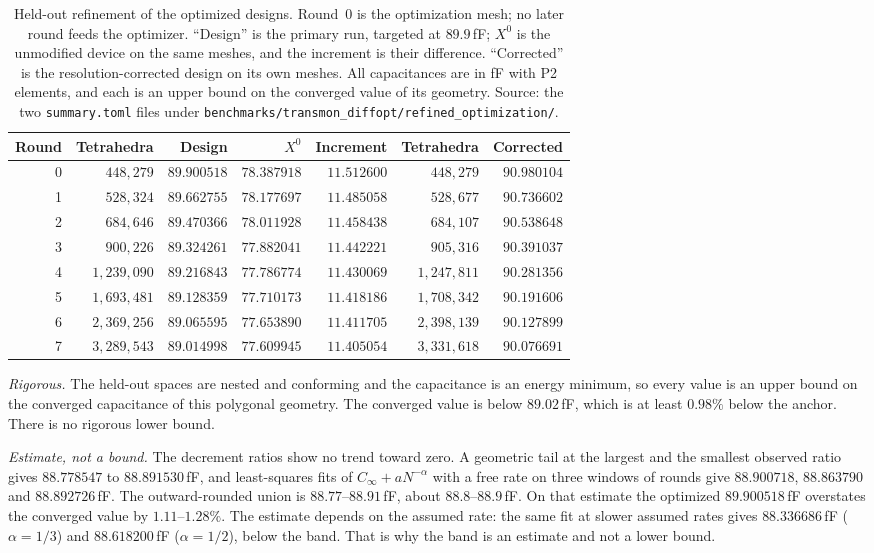 \documentclass{anvil-paper}
\begin{document}
\begin{table}[t]
  \centering
  \caption{Held-out refinement of the optimized designs. Round~0 is the
  optimization mesh; no later round feeds the optimizer. ``Design'' is
  the primary run, targeted at $89.9$\,fF; $X^0$ is the unmodified
  device on the same meshes, and the increment is their difference.
  ``Corrected'' is the resolution-corrected design on its own meshes.
  All capacitances are in fF with P2 elements, and each is an upper
  bound on the converged value of its geometry. Source: the two
  \texttt{summary.toml} files under
  \texttt{benchmarks/transmon\_diffopt/refined\_optimization/}.}
  \label{tab:heldout}
  \footnotesize
  \setlength{\tabcolsep}{4pt}
  \begin{tabular}{@{}rrrrrrr@{}}
    \toprule
    Round & Tetrahedra & Design & $X^0$ & Increment & Tetrahedra & Corrected \\
    \midrule
    0 & $448{,}279$ & $89.900518$ & $78.387918$ & $11.512600$ & $448{,}279$ & $90.980104$ \\
    1 & $528{,}324$ & $89.662755$ & $78.177697$ & $11.485058$ & $528{,}677$ & $90.736602$ \\
    2 & $684{,}646$ & $89.470366$ & $78.011928$ & $11.458438$ & $684{,}107$ & $90.538648$ \\
    3 & $900{,}226$ & $89.324261$ & $77.882041$ & $11.442221$ & $905{,}316$ & $90.391037$ \\
    4 & $1{,}239{,}090$ & $89.216843$ & $77.786774$ & $11.430069$ & $1{,}247{,}811$ & $90.281356$ \\
    5 & $1{,}693{,}481$ & $89.128359$ & $77.710173$ & $11.418186$ & $1{,}708{,}342$ & $90.191606$ \\
    6 & $2{,}369{,}256$ & $89.065595$ & $77.653890$ & $11.411705$ & $2{,}398{,}139$ & $90.127899$ \\
    7 & $3{,}289{,}543$ & $89.014998$ & $77.609945$ & $11.405054$ & $3{,}331{,}618$ & $90.076691$ \\
    \bottomrule
  \end{tabular}
\end{table}

\emph{Rigorous.} The held-out spaces are nested and conforming and the
capacitance is an energy minimum, so every value is an upper bound on
the converged capacitance of this polygonal geometry. The converged
value is below $89.02$\,fF, which is at least $0.98\%$ below the
anchor. There is no rigorous lower bound.

\emph{Estimate, not a bound.} The decrement ratios show no trend toward
zero. A geometric tail at the largest and the smallest observed ratio
gives $88.778547$ to $88.891530$\,fF, and least-squares fits of
$C_\infty + a N^{-\alpha}$ with a free rate on three windows of rounds
give $88.900718$, $88.863790$ and $88.892726$\,fF. The outward-rounded
union is $88.77$--$88.91$\,fF, about $88.8$--$88.9$\,fF. On that
estimate the optimized $89.900518$\,fF overstates the converged value
by $1.11$--$1.28\%$. The estimate depends on the assumed rate: the same
fit at slower assumed rates gives $88.336686$\,fF ($\alpha = 1/3$) and
$88.618200$\,fF ($\alpha = 1/2$), below the band. That is why the band
is an estimate and not a lower bound.
\end{document}
